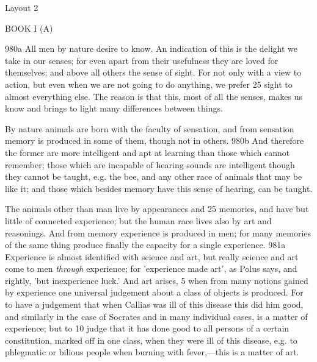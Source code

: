
Layout 2

BOOK I (Α)


980a All men by nature desire to know. An indication of this is the delight we take in our senses; for even apart from their usefulness they are loved for themselves; and above all others the sense of sight. For not only with a view to action, but even when we are not going to do anything, we prefer 25 sight to almost everything else. The reason is that this, most of all the senses, makes us know and brings to light many differences between things.

By nature animals are born with the faculty of sensation, and from sensation memory is produced in some of them, though not in others. 980b And therefore the former are more intelligent and apt at learning than those which cannot remember; those which are incapable of hearing sounds are intelligent though they cannot be taught, e.g. the bee, and any other race of animals that may be like it; and those which besides memory have this sense of hearing, can be taught.

The animals other than man live by appearances and 25 memories, and have but little of connected experience; but the human race lives also by art and reasonings. And from memory experience is produced in men; for many memories of the same thing produce finally the capacity for a single experience. 981a Experience is almost identified with science and art, but really science and art come to men \emph{through} experience; for 'experience made art', as Polus says, and rightly, 'but inexperience luck.' And art arises, 5 when from many notions gained by experience one universal judgement about a class of objects is produced. For to have a judgement that when Callias was ill of this disease this did him good, and similarly in the case of Socrates and in many individual cases, is a matter of experience; but to 10 judge that it has done good to all persons of a certain constitution, marked off in one class, when they were ill of this disease, e.g. to phlegmatic or bilious people when burning with fever,—this is a matter of art.


